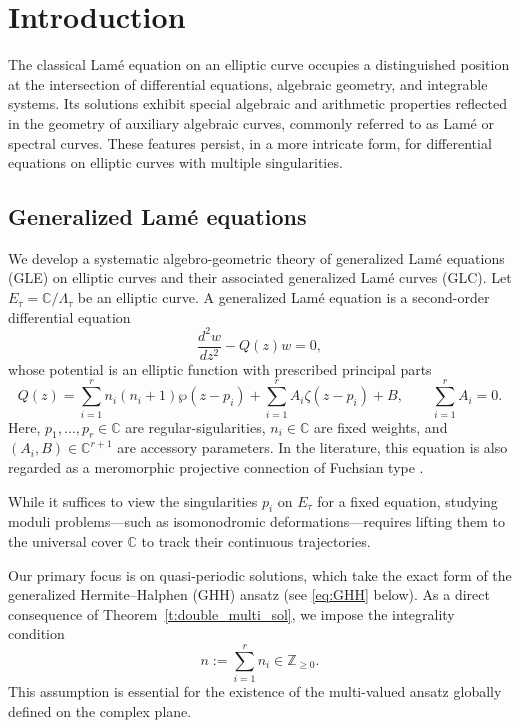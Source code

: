 \documentclass[11pt]{amsart}
\theoremstyle{remark}
\numberwithin{equation}{section}
\begin{document}
\section{Introduction}

The classical Lam\'e equation on an elliptic curve occupies a distinguished position at the intersection of differential equations, algebraic geometry, and integrable systems. Its solutions exhibit special algebraic and arithmetic properties reflected in the geometry of auxiliary algebraic curves, commonly referred to as Lam\'e or spectral curves. These features persist, in a more intricate form, for differential equations on elliptic curves with multiple singularities.

\subsection{Generalized Lam\'e equations}
We develop a systematic algebro-geometric theory of generalized Lam\'e equations (GLE) on elliptic curves and their associated generalized Lam\'e curves (GLC). Let $E_\tau=\mathbb{C}/\Lambda_\tau$ be an elliptic curve. A generalized Lam\'e equation is a second-order differential equation
\begin{equation}\label{eq:GLE}
\frac{d^2 w}{dz^2}-Q(z)w=0,
\end{equation}
whose potential is an elliptic function with prescribed principal parts
\begin{equation}\label{eq:potential}
Q(z)=\sum_{i=1}^r n_i(n_i+1)\wp(z-p_i)+\sum_{i=1}^r A_i\zeta(z-p_i)+B,
\qquad \sum_{i=1}^r A_i=0.
\end{equation}
Here, $p_1,\dots,p_r \in \mathbb{C}$ are regular-sigularities, $n_i\in\mathbb{C}$ are fixed weights, and $(A_i,B)\in \mathbb{C}^{r+1}$ are accessory parameters. In the literature, this equation is also regarded as a meromorphic projective connection of Fuchsian type \cite{Iwasaki_1991, Kawai_1996}.

While it suffices to view the singularities $p_i$ on $E_\tau$ for a fixed equation, studying moduli problems---such as isomonodromic deformations---requires lifting them to the universal cover $\mathbb{C}$ to track their continuous trajectories.

Our primary focus is on quasi-periodic solutions, which take the exact form of the generalized Hermite--Halphen (GHH) ansatz (see \eqref{eq:GHH} below). As a direct consequence of Theorem~\ref{t:double_multi_sol}, we impose the integrality condition
\[
n := \sum_{i=1}^r n_i \in \mathbb{Z}_{\geq 0}.
\]
This assumption is essential for the existence of the multi-valued ansatz globally defined on the complex plane.
\end{document}
